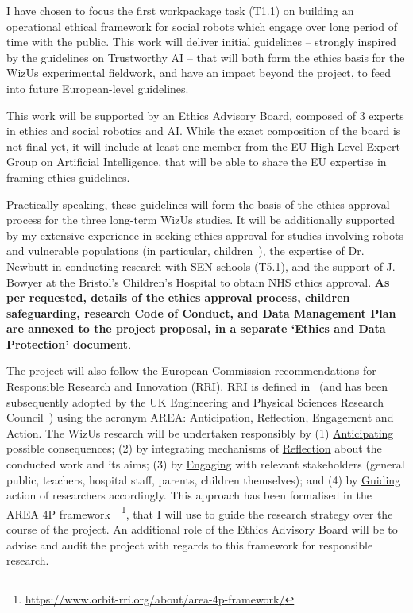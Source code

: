 \documentclass[11pt,a4paper]{report}
\newcommand{\project}{WizUs\xspace}
\begin{document}
I have chosen to focus the first workpackage task (T1.1) on building an
operational ethical framework for social robots which engage over long period of
time with the public. This work will deliver initial guidelines -- strongly
inspired by the guidelines on Trustworthy AI -- that will both form the ethics
basis for the \project experimental fieldwork, and have an impact beyond the
project, to feed into future European-level guidelines.

This work will be supported by an Ethics Advisory Board, composed of 3 experts
in ethics and social robotics and AI. While the exact composition of the board
is not final yet, it will include at least one member from the EU High-Level
Expert Group on Artificial Intelligence, that will be able to share the EU
expertise in framing ethics guidelines.

Practically speaking, these guidelines will form the basis of the ethics
approval process for the three long-term \project studies. It will be
additionally supported by my extensive experience in seeking ethics approval for
studies involving robots and vulnerable populations (in particular,
children~\cite{lemaignan2016learning,lemaignan2018pinsoro,senft2019teaching}),
the expertise of Dr. Newbutt in conducting research with SEN schools (T5.1), and
the support of J. Bowyer at the Bristol's Children's Hospital to obtain NHS ethics
approval. \textbf{As per requested, details of the ethics approval process,
children safeguarding, research Code of Conduct, and Data Management Plan are
annexed to the project proposal, in a separate `Ethics and Data Protection'
document}.

The project will also follow the European Commission recommendations for
Responsible Research and Innovation (RRI). RRI is defined
in~\cite{stilgoe2013developing} (and has been subsequently adopted by the UK Engineering
and Physical Sciences Research Council~\cite{owen2014uk}) using the acronym
AREA: Anticipation, Reflection, Engagement and Action. The \project research
will be undertaken responsibly by (1) \ul{Anticipating} possible consequences;
(2) by integrating mechanisms of \ul{Reflection} about the conducted work and its
aims; (3) by \ul{Engaging} with relevant stakeholders (general public, teachers,
hospital staff, parents, children themselves); and (4) by \ul{Guiding} action of
researchers accordingly. This approach has been formalised in the AREA 4P
framework~\cite{stahl2018implementing}~\footnote{\url{https://www.orbit-rri.org/about/area-4p-framework/}},
that I will use to guide the research strategy over the course of the project.
An additional role of the Ethics Advisory Board will be to advise and audit the
project with regards to this framework for responsible research.
\end{document}
